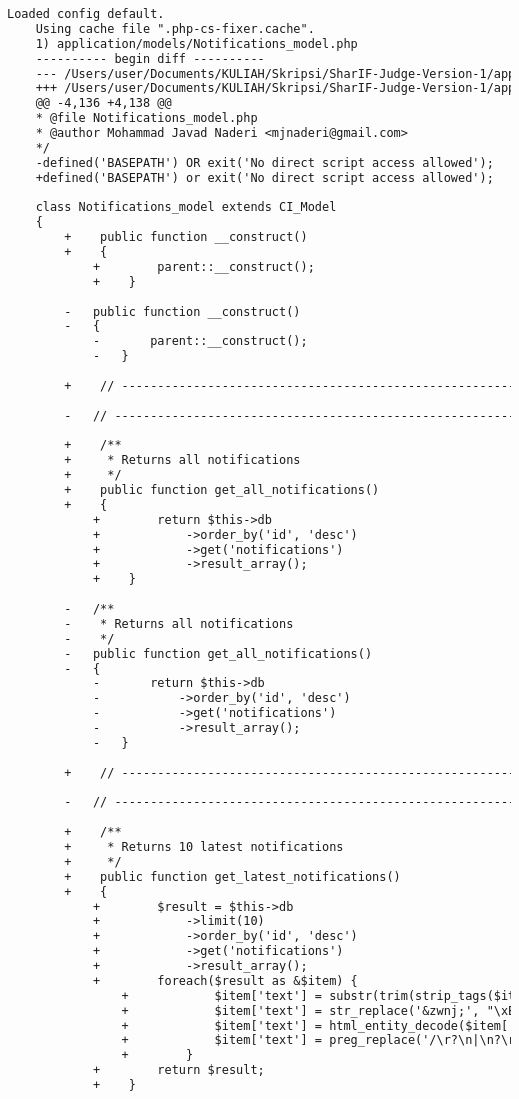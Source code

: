 \begin{lstlisting}[language=diff, caption=Perubahan pada kode Notifications\_model.php]
	Loaded config default.
	Using cache file ".php-cs-fixer.cache".
	1) application/models/Notifications_model.php
	---------- begin diff ----------
	--- /Users/user/Documents/KULIAH/Skripsi/SharIF-Judge-Version-1/application/models/Notifications_model.php
	+++ /Users/user/Documents/KULIAH/Skripsi/SharIF-Judge-Version-1/application/models/Notifications_model.php
	@@ -4,136 +4,138 @@
	* @file Notifications_model.php
	* @author Mohammad Javad Naderi <mjnaderi@gmail.com>
	*/
	-defined('BASEPATH') OR exit('No direct script access allowed');
	+defined('BASEPATH') or exit('No direct script access allowed');
	
	class Notifications_model extends CI_Model
	{
		+    public function __construct()
		+    {
			+        parent::__construct();
			+    }
		
		-	public function __construct()
		-	{
			-		parent::__construct();
			-	}
		
		+    // ------------------------------------------------------------------------
		
		-	// ------------------------------------------------------------------------
		
		+    /**
		+     * Returns all notifications
		+     */
		+    public function get_all_notifications()
		+    {
			+        return $this->db
			+            ->order_by('id', 'desc')
			+            ->get('notifications')
			+            ->result_array();
			+    }
		
		-	/**
		-	 * Returns all notifications
		-	 */
		-	public function get_all_notifications()
		-	{
			-		return $this->db
			-			->order_by('id', 'desc')
			-			->get('notifications')
			-			->result_array();
			-	}
		
		+    // ------------------------------------------------------------------------
		
		-	// ------------------------------------------------------------------------
		
		+    /**
		+     * Returns 10 latest notifications
		+     */
		+    public function get_latest_notifications()
		+    {
			+        $result = $this->db
			+            ->limit(10)
			+            ->order_by('id', 'desc')
			+            ->get('notifications')
			+            ->result_array();
			+        foreach($result as &$item) {
				+            $item['text'] = substr(trim(strip_tags($item['text'])), 0, 300);
				+            $item['text'] = str_replace('&zwnj;', "\xE2\x80\x8c", $item['text']);
				+            $item['text'] = html_entity_decode($item['text']);
				+            $item['text'] = preg_replace('/\r?\n|\n?\r/', ' ', $item['text']);
				+        }
			+        return $result;
			+    }
		

\end{lstlisting}
